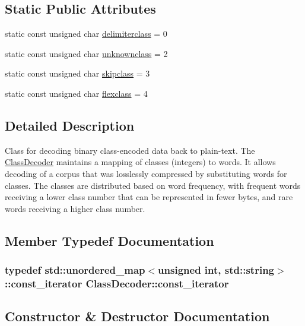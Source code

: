 \subsection*{Static Public Attributes}
\begin{DoxyCompactItemize}
\item 
static const unsigned char \hyperlink{classClassDecoder_a878d35a6832b7967ed57eb074a833f90}{delimiterclass} = 0
\item 
static const unsigned char \hyperlink{classClassDecoder_a802ad043ecd17751c2e3520170649f4e}{unknownclass} = 2
\item 
static const unsigned char \hyperlink{classClassDecoder_a65bd3f4f5100e8d3743b82b0643aa4f7}{skipclass} = 3
\item 
static const unsigned char \hyperlink{classClassDecoder_a19f0b9f9aca599e1bfc271f61dff15a1}{flexclass} = 4
\end{DoxyCompactItemize}


\subsection{Detailed Description}
Class for decoding binary class-\/encoded data back to plain-\/text. The \hyperlink{classClassDecoder}{Class\+Decoder} maintains a mapping of classes (integers) to words. It allows decoding of a corpus that was losslessly compressed by substituting words for classes. The classes are distributed based on word frequency, with frequent words receiving a lower class number that can be represented in fewer bytes, and rare words receiving a higher class number. 

\subsection{Member Typedef Documentation}
\hypertarget{classClassDecoder_a24770930683eb9829a898343fe016929}{}
\subsubsection[{const\+\_\+iterator}]{\setlength{\rightskip}{0pt plus 5cm}typedef std\+::unordered\+\_\+map$<$unsigned int, std\+::string$>$\+::{\bf const\+\_\+iterator} {\bf Class\+Decoder\+::const\+\_\+iterator}}\label{classClassDecoder_a24770930683eb9829a898343fe016929}


\subsection{Constructor \& Destructor Documentation}
\hypertarget{classClassDecoder_a1964931b3b4f83220f0468e9a5a3f5ab}{}
